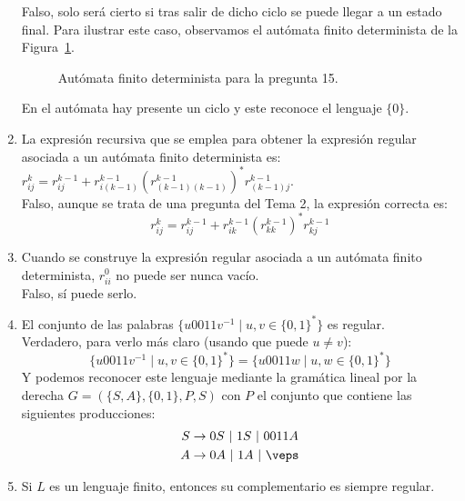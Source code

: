 \begin{enumerate}
        Falso, solo será cierto si tras salir de dicho ciclo se puede llegar a un estado final. Para ilustrar este caso, observamos el autómata finito determinista de la Figura~\ref{fig:tipo_test15}.
        \begin{figure}[H]
           \centering
           \caption{Autómata finito determinista para la pregunta 15.}
           \label{fig:tipo_test15}
       \end{figure}
       En el autómata hay presente un ciclo y este reconoce el lenguaje $\{0\}$.
    \item La expresión recursiva que se emplea para obtener la expresión regular asociada a un autómata finito determinista es: $r^k_{ij} = r^{k-1}_{ij} + r^{k-1}_{i(k-1)}{(r^{k-1}_{(k-1)(k-1)})}^{\ast}r^{k-1}_{(k-1)j}$.\\

        Falso, aunque se trata de una pregunta del Tema 2, la expresión correcta es:
        \begin{equation*}
            r_{ij}^k = r_{ij}^{k-1} + r_{ik}^{k-1}{(r_{kk}^{k-1})}^{\ast}r_{kj}^{k-1}
        \end{equation*}
    \item Cuando se construye la expresión regular asociada a un autómata finito determinista, $r^0_{ii}$ no puede ser nunca vacío.\\

        Falso, sí puede serlo.
    \item El conjunto de las palabras $\{u0011v^{-1} \mid u,v\in {\{0,1\}}^{\ast}\}$ es regular.\\

        Verdadero, para verlo más claro (usando que puede $u\neq v$):
        \begin{equation*}
            \{u0011v^{-1}\mid u,v\in {\{0,1\}}^{\ast}\} = \{u0011w \mid u,w\in {\{0,1\}}^{\ast}\}
        \end{equation*}
        Y podemos reconocer este lenguaje mediante la gramática lineal por la derecha $G=(\{S,A\},\{0,1\},P,S)$ con $P$ el conjunto que contiene las siguientes producciones:
        \begin{align*}
            S &\rightarrow 0S\ |\ 1S\ |\ 0011A \\
            A &\rightarrow 0A\ |\ 1A\ |\ \veps
        \end{align*}
    \item Si $L$ es un lenguaje finito, entonces su complementario es siempre regular.\\


\end{enumerate}
